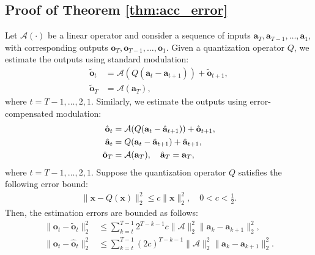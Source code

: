 \subsection{Proof of Theorem \ref{thm:acc_error}}
\label{proof:acc_error}
\begin{theorem}
Let \(\mathcal{A}(\cdot)\) be a linear operator and consider a sequence of inputs \(\mathbf{a}_T, \mathbf{a}_{T-1}, \dots, \mathbf{a}_1\), with corresponding outputs \(\mathbf{o}_T, \mathbf{o}_{T-1}, \dots, \mathbf{o}_1\). Given a quantization operator \(Q\), we estimate the outputs using standard modulation: 
\begin{align}
\label{eqn:modulation}
    \tilde{\mathbf{o}}_t &= \mathcal{A}(Q(\mathbf{a}_t - \mathbf{a}_{t+1})) + \tilde{\mathbf{o}}_{t+1}, \\
\label{eqn:ecmodulation}
    \tilde{\mathbf{o}}_T &= \mathcal{A}(\mathbf{a}_T),
\end{align}
where \( t = T-1, \dots, 2, 1 \). Similarly, we estimate the outputs using error-compensated modulation:  
\begin{align}
    \hat{\mathbf{o}}_t &= \mathcal{A}(Q(\mathbf{a}_t - \hat{\mathbf{a}}_{t+1})) + \hat{\mathbf{o}}_{t+1}, \\
    \hat{\mathbf{a}}_t &= Q(\mathbf{a}_t - \hat{\mathbf{a}}_{t+1}) + \hat{\mathbf{a}}_{t+1}, \\
    \hat{\mathbf{o}}_T &= \mathcal{A}(\mathbf{a}_T), \quad
    \hat{{\mathbf{a}}}_T = {\mathbf{a}}_T,
\end{align}
where \( t = T-1, \dots, 2, 1 \). Suppose the quantization operator \(Q\) satisfies the following error bound: 
\begin{align}
    \|\mathbf{x} - Q(\mathbf{x})\|_2^2 \leq c\|\mathbf{x}\|_2^2, \quad 0 < c < \frac{1}{2}.
\end{align}
Then, the estimation errors are bounded as follows:  
\begin{align}
\label{eqn:con1}
    \|\mathbf{o}_t - \tilde{\mathbf{o}}_t\|_2^2 &\leq \sum_{k=t}^{T-1} 2^{T-k-1} c \|\mathcal{A}\|_2^2 \|\mathbf{a}_k - \mathbf{a}_{k+1}\|_2^2, \\
    \label{eqn:con2}
    \|\mathbf{o}_t - \hat{\mathbf{o}}_t\|_2^2 &\leq \sum_{k=t}^{T-1} (2c)^{T-k-1} \|\mathcal{A}\|_2^2 \|\mathbf{a}_k - \mathbf{a}_{k+1}\|_2^2.
\end{align}
\end{theorem}

